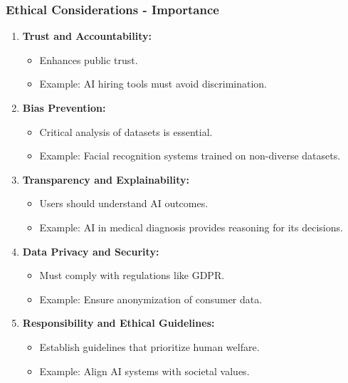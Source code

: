 \documentclass[aspectratio=169]{beamer}
\begin{document}
\begin{frame}[fragile]
    \frametitle{Ethical Considerations - Importance}
    \begin{enumerate}
        \item \textbf{Trust and Accountability:}
        \begin{itemize}
            \item Enhances public trust.
            \item Example: AI hiring tools must avoid discrimination.
        \end{itemize}
        
        \item \textbf{Bias Prevention:}
        \begin{itemize}
            \item Critical analysis of datasets is essential.
            \item Example: Facial recognition systems trained on non-diverse datasets.
        \end{itemize}
        
        \item \textbf{Transparency and Explainability:}
        \begin{itemize}
            \item Users should understand AI outcomes.
            \item Example: AI in medical diagnosis provides reasoning for its decisions.
        \end{itemize}
        
        \item \textbf{Data Privacy and Security:}
        \begin{itemize}
            \item Must comply with regulations like GDPR.
            \item Example: Ensure anonymization of consumer data.
        \end{itemize}
        
        \item \textbf{Responsibility and Ethical Guidelines:}
        \begin{itemize}
            \item Establish guidelines that prioritize human welfare.
            \item Example: Align AI systems with societal values.
        \end{itemize}
    \end{enumerate}
\end{frame}
\end{document}
